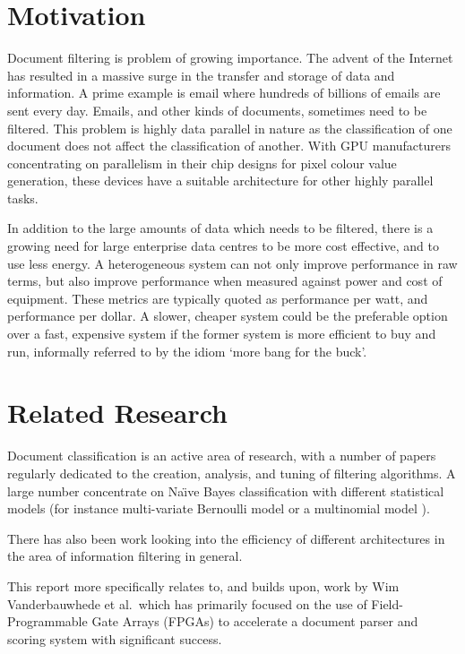 \section{Motivation}

Document filtering is problem of growing importance. The advent of the Internet
has resulted in a massive surge in the transfer and storage of data and
information. A prime example is email where hundreds of billions of emails are
sent every day. Emails, and other kinds of documents, sometimes need to be
filtered. This problem is highly data parallel in nature as the classification
of one document does not affect the classification of another. With GPU
manufacturers concentrating on parallelism in their chip designs for pixel
colour value generation, these devices have a suitable architecture for other
highly parallel tasks.

In addition to the large amounts of data which needs to be filtered, there is a
growing need for large enterprise data centres to be more cost effective, and to
use less energy. A heterogeneous system can not only improve performance in raw
terms, but also improve performance when measured against power and cost of
equipment. These metrics are typically quoted as performance per watt, and
performance per dollar. A slower, cheaper system could be the preferable option
over a fast, expensive system if the former system is more efficient to buy and
run, informally referred to by the idiom `more bang for the buck'.

\section{Related Research}
\label{sec:relatedResearch}

Document classification is an active area of research, with a number of papers
regularly dedicated to the creation, analysis, and tuning of filtering
algorithms. A large number concentrate on Na{\"{\i}}ve Bayes classification
\cite{androutsopoulos2000evaluation} \cite{androutsopoulos2000learning}  with
different statistical models (for instance multi-variate Bernoulli model
\cite{Schneider:2003:CEM:1067807.1067848} or a multinomial model
\cite{mccallum1998comparison}).

There has also been work looking into the efficiency of different architectures
in the area of information filtering \cite{chen2012invited}
\cite{he2013massively} in general.

This report more specifically relates to, and builds upon, work by Wim
Vanderbauwhede et al.\ which has primarily focused on the use of Field-
Programmable Gate Arrays (FPGAs) to accelerate a document parser and scoring
system \cite{vanderbauwhede2013high} \cite{HybridCPUFPGA}
\cite{chalamalasetti2012evaluating} with significant success.

